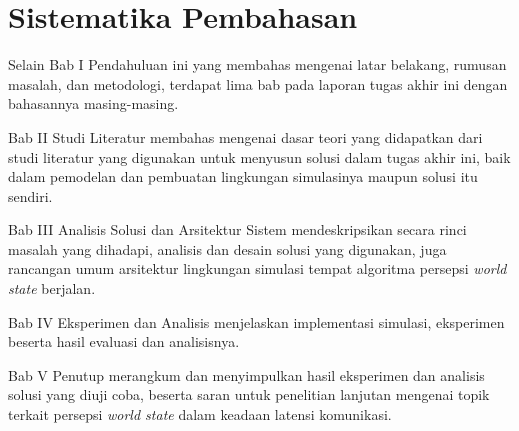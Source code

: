 \section{Sistematika Pembahasan}

Selain Bab I Pendahuluan ini yang membahas mengenai latar belakang, rumusan masalah, dan metodologi, terdapat lima bab pada laporan tugas akhir ini dengan bahasannya masing-masing.

Bab II Studi Literatur membahas mengenai dasar teori yang didapatkan dari studi literatur yang digunakan untuk menyusun solusi dalam tugas akhir ini, baik dalam pemodelan dan pembuatan lingkungan simulasinya maupun solusi itu sendiri.

Bab III Analisis Solusi dan Arsitektur Sistem mendeskripsikan secara rinci masalah yang dihadapi, analisis dan desain solusi yang digunakan, juga rancangan umum arsitektur lingkungan simulasi tempat algoritma persepsi \textit{world state} berjalan.

Bab IV Eksperimen dan Analisis menjelaskan implementasi simulasi, eksperimen beserta hasil evaluasi dan analisisnya.

Bab V Penutup merangkum dan menyimpulkan hasil eksperimen dan analisis solusi yang diuji coba, beserta saran untuk penelitian lanjutan mengenai topik terkait persepsi \textit{world state} dalam keadaan latensi komunikasi.
